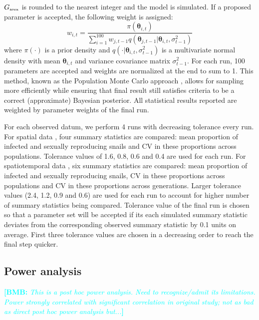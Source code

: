 \documentclass{article}\usepackage[]{graphicx}\usepackage[]{color}
\newcommand{\comment}[3]{\textcolor{#1}{\textbf{[#2: }\textit{#3}\textbf{]}}}
\newcommand{\bmb}[1]{\comment{cyan}{BMB}{#1}}
\begin{document}
$G_{\textrm{\tiny asex}}$ is rounded to the nearest integer and the model is simulated.
If a proposed parameter is accepted, the following weight is assigned:
$$
w_{i,t} = \frac{\pi(\bm\theta_{i, t})}{\sum_{i=1}^{100} w_{j, t-1} q(\bm\theta_{j, t-1} | \bm\theta_{i,t}, \sigma_{t-1}^2)}
$$
where $\pi(\cdot)$ is a prior density and $q(\cdot | \bm\theta_{i,t}, \sigma_{t-1}^2)$ is a multivariate normal density with mean $\bm\theta_{i,t}$ and variance covariance matrix $\sigma_{t-1}^2$.
For each run, 100 parameters are accepted and weights are normalized at the end to sum to 1.
This method, known as the Population Monte Carlo approach \citep{turner2012tutorial}, allows for sampling more efficiently while ensuring that final result still satisfies criteria to be a correct (approximate) Bayesian posterior.
All statistical results reported are weighted by parameter weights of the final run.

For each observed datum, we perform 4 runs with decreasing tolerance every run.
For spatial data \citep{dagan2013clonal, mckone2016fine}, four summary statistics are compared: mean proportion of infected and sexually reproducing snails and CV in these proportions across populations.
Tolerance values of 1.6, 0.8, 0.6 and 0.4 are used for each run.
For spatiotemporal data \citep{vergara2014infection}, six summary statistics are compared: mean proportion of infected and sexually reproducing snails, CV in these proportions across populations and CV in these proportions across generations.
Larger tolerance values (2.4, 1.2, 0.9 and 0.6) are used for each run to account for higher number of summary statistics being compared.
Tolerance value of the final run is chosen so that a parameter set will be accepted if its each simulated summary statistic deviates from the corresponding observed summary statistic by 0.1 units on average.
First three tolerance values are chosen in a decreasing order to reach the final step quicker.

\subsection{Power analysis}

\bmb{This is a post hoc power analysis. Need to recognize/admit its limitations. Power strongly correlated with significant correlation in original study; not as bad as direct post hoc power analysis but...}
\end{document}
